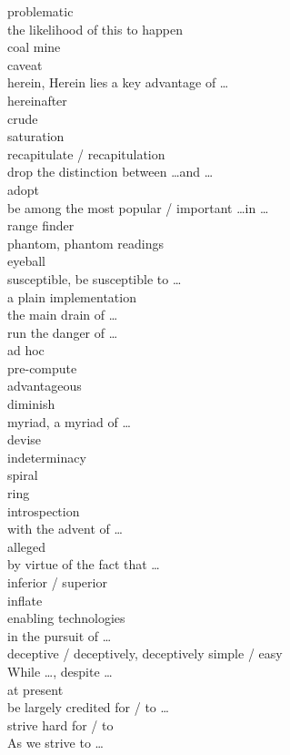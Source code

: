 \documentclass[12pt]{article}
\begin{document}
problematic \\
the likelihood of this to happen \\
coal mine \\
caveat \\
herein, Herein lies a key advantage of \dots \\
hereinafter \\
crude \\
saturation \\
recapitulate / recapitulation \\
drop the distinction between \dots and \dots \\
adopt \\
be among the most popular / important \dots in \dots \\
range finder \\
phantom, phantom readings \\
eyeball \\
susceptible, be susceptible to \dots \\
a plain implementation\\
the main drain of \dots \\
run the danger of \dots \\
ad hoc \\
pre-compute \\
advantageous \\
diminish \\
myriad, a myriad of \dots \\
devise \\
indeterminacy \\
spiral \\
ring \\
introspection \\
with the advent of \dots \\
alleged \\
by virtue of the fact that \dots \\
inferior / superior \\
inflate \\
enabling technologies \\
in the pursuit of \dots \\
deceptive / deceptively, deceptively simple / easy \\
While \dots, despite \dots \\
at present \\
be largely credited for / to \dots \\
strive hard for / to \\
As we strive to \dots \\
\end{document}
